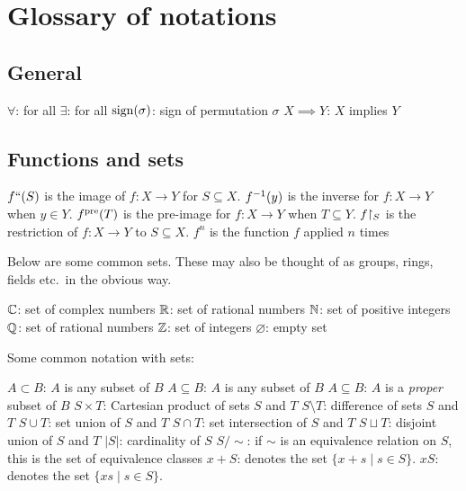\chapter{Glossary of notations}


\section{General}
\begin{itemize}
	\ii $\forall$: for all
	\ii $\exists$: for all
	\ii $\operatorname{sign}(\sigma)$: sign of permutation $\sigma$
	\ii $X \implies Y$: $X$ implies $Y$
\end{itemize}
\section{Functions and sets}
\begin{itemize}
	\ii $f``(S)$ is the image of $f : X \to Y$ for $S \subseteq X$.
	\ii $f^{-1}(y)$ is the inverse for $f : X \to Y$ when $y \in Y$.
	\ii $f^{\text{pre}}(T)$ is the pre-image for $f : X \to Y$ when $T \subseteq Y$.
	\ii $f \restrict{S}$ is the restriction of $f : X \to Y$ to $S \subseteq X$.
	\ii $f^n$ is the function $f$ applied $n$ times
\end{itemize}

Below are some common sets.
These may also be thought of as groups,
rings, fields etc.\ in the obvious way.
\begin{itemize}
	\ii $\mathbb C$: set of complex numbers
	\ii $\mathbb R$: set of rational numbers
	\ii $\mathbb N$: set of positive integers
	\ii $\mathbb Q$: set of rational numbers
	\ii $\mathbb Z$: set of integers
	\ii $\varnothing$: empty set
\end{itemize}

Some common notation with sets:
\begin{itemize}
	\ii $A \subset B$: $A$ is any subset of $B$
	\ii $A \subseteq B$: $A$ is any subset of $B$
	\ii $A \subseteq B$: $A$ is a \emph{proper} subset of $B$
	\ii $S \times T$: Cartesian product of sets $S$ and $T$
	\ii $S \setminus T$: difference of sets $S$ and $T$
	\ii $S \cup T$: set union of $S$ and $T$
	\ii $S \cap T$: set intersection of $S$ and $T$
	\ii $S \sqcup T$: disjoint union of $S$ and $T$
	\ii $\left\lvert S \right\rvert$: cardinality of $S$
	\ii $S / {\sim}$: if $\sim$ is an equivalence relation on $S$,
	this is the set of equivalence classes
	\ii $x + S$: denotes the set $\{x+s \mid s \in S\}$.
	\ii $xS$: denotes the set $\{xs \mid s \in S\}$.
\end{itemize}

